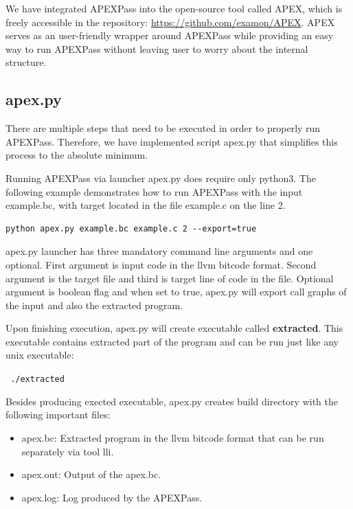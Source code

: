 \documentclass[12pt, twoside]{fithesis2}
\renewcommand{\_}{\leavevmode \kern0.07em\vbox{\hrule width0.4em}}
\newcommand{\squarebullet}{\textcolor{black}{\raisebox{0.15em}{\rule{4pt}{4pt}}}}
\newenvironment{myItemize}{
  \begin{itemize}[
    leftmargin=2em,
    rightmargin=1em,
    itemsep=\parskip,
    parsep=0em,
    topsep=0em,
    partopsep=0em
]
  \renewcommand{\labelitemi}{\squarebullet}
  \renewcommand{\labelitemii}{\textbullet}
}{
  \end{itemize}
}
\begin{document}
We have integrated APEXPass into the open-source tool called APEX, which is
freely accessible in the repository: \url{https://github.com/examon/APEX}.
APEX serves as an user-friendly wrapper around APEXPass
while providing an easy way to run APEXPass without leaving user to
worry about the internal structure.

\subsection{apex.py}

There are multiple steps that need to be executed in order to properly
run APEXPass. Therefore, we have implemented script apex.py that simplifies
this process to the absolute minimum.

Running APEXPass via launcher apex.py does require only python3. The following
example demonstrates how to run APEXPass with the input example.bc, with target
located in the file example.c on the line 2.

\begin{verbatim}
python apex.py example.bc example.c 2 --export=true
\end{verbatim}

apex.py launcher has three mandatory command line arguments and one optional.
First argument is input code in the llvm bitcode format. Second argument is the
target file and third is target line of code in the file.
Optional argument is boolean flag and when set to true, apex.py will
export call graphs of the input and also the extracted program.

Upon finishing execution, apex.py will create executable called
\textbf{extracted}. This executable contains extracted part of the program and
can be run just like any unix executable:

\texttt{
./extracted
}

Besides producing exected executable, apex.py creates build directory with the
following important files:

\begin{myItemize}
\item apex.bc: Extracted program in the llvm bitcode format that can be run separately
via tool lli.
\item apex.out: Output of the apex.bc.
\item apex.log: Log produced by the APEXPass.
\end{myItemize}
\end{document}
